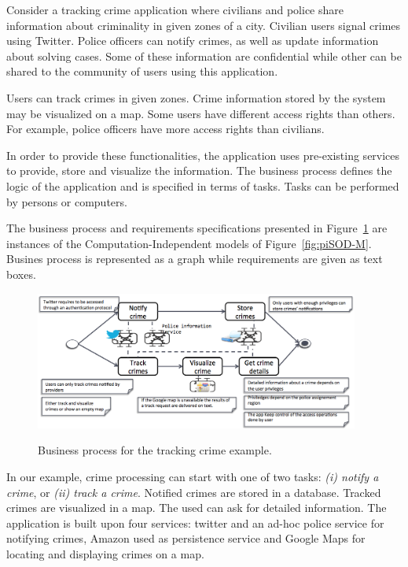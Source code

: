 
Consider a tracking crime application where civilians and police share information about criminality in given zones of a city. 
Civilian users signal crimes using Twitter.
Police officers can notify crimes, as well as update information about solving cases.
Some of these information are confidential while other can be shared
to the community of users using this application. 

Users can track crimes in given zones. 
Crime information stored by the system may be visualized on a map. 
Some users have different access rights than others.
For example, police officers have more access rights than civilians.


In order to provide these functionalities, the application uses pre-existing services to provide, store and visualize the information.
The business process defines the logic of the application and is specified in terms of tasks. 
Tasks can be performed by persons or computers. 

The business process and requirements specifications presented in Figure~\ref{fig:constraints} are instances of the Computation-Independent models of Figure~\ref{fig:piSOD-M}.
Busines process is represented as a graph while requirements are given as text boxes.
\begin{figure}[ht!]
\centering
{\label{fig:trans06}\includegraphics[width=0.95\textwidth]{figs/constraints}}
~ %
\caption{Business process for the tracking crime example.}
\label{fig:constraints}
\end{figure}

In our example, crime processing can start with one of two tasks: \textit{(i) notify a crime}, or \textit{(ii) track a crime}.
Notified crimes are stored in a database. 
Tracked crimes are visualized in a map.
The used can ask for detailed information. 
The application is built upon four services: \textsf{twitter} and an \textsf{ad-hoc police service} for notifying crimes, \textsf{Amazon} used as  persistence service and  \textsf{Google Maps} for locating and displaying crimes on a map.

